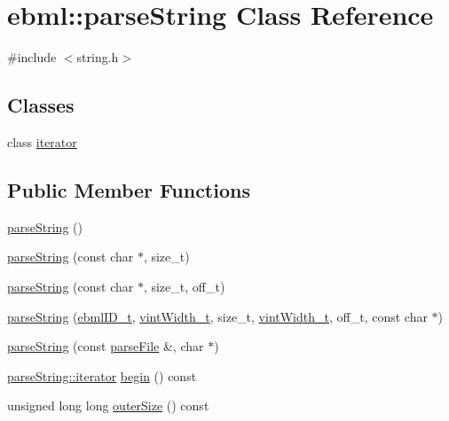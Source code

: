 \hypertarget{classebml_1_1parseString}{}\section{ebml\+:\+:parse\+String Class Reference}
\label{classebml_1_1parseString}


{\ttfamily \#include $<$string.\+h$>$}

\subsection*{Classes}
\begin{DoxyCompactItemize}
\item 
class \mbox{\hyperlink{classebml_1_1parseString_1_1iterator}{iterator}}
\end{DoxyCompactItemize}
\subsection*{Public Member Functions}
\begin{DoxyCompactItemize}
\item 
\mbox{\hyperlink{classebml_1_1parseString_a3a10573e754e6c5b8bc9160f8840a891}{parse\+String}} ()
\item 
\mbox{\hyperlink{classebml_1_1parseString_a470d1e427ce5fe9404fcecb5d9c9096a}{parse\+String}} (const char $\ast$, size\+\_\+t)
\item 
\mbox{\hyperlink{classebml_1_1parseString_a4db881a13f2a44cfdd6e21f92c576ea7}{parse\+String}} (const char $\ast$, size\+\_\+t, off\+\_\+t)
\item 
\mbox{\hyperlink{classebml_1_1parseString_a0bd938e435b4c6c02967901a79f86f13}{parse\+String}} (\mbox{\hyperlink{namespaceebml_a86c5f604ddf12a74aa9812e997a58691}{ebml\+I\+D\+\_\+t}}, \mbox{\hyperlink{namespaceebml_a2ccdfb60b23efb51fe07f9d066e23604}{vint\+Width\+\_\+t}}, size\+\_\+t, \mbox{\hyperlink{namespaceebml_a2ccdfb60b23efb51fe07f9d066e23604}{vint\+Width\+\_\+t}}, off\+\_\+t, const char $\ast$)
\item 
\mbox{\hyperlink{classebml_1_1parseString_a3274d8ebf9c24ef060b486b6b5db00e2}{parse\+String}} (const \mbox{\hyperlink{classebml_1_1parseFile}{parse\+File}} \&, char $\ast$)
\item 
\mbox{\hyperlink{classebml_1_1parseString_1_1iterator}{parse\+String\+::iterator}} \mbox{\hyperlink{classebml_1_1parseString_abb053ba094e647124133d7b9ab3a5f4d}{begin}} () const
\item 
unsigned long long \mbox{\hyperlink{classebml_1_1parseString_afd5aacb39340b2f965a729a0dfd74855}{outer\+Size}} () const
\end{DoxyCompactItemize}
